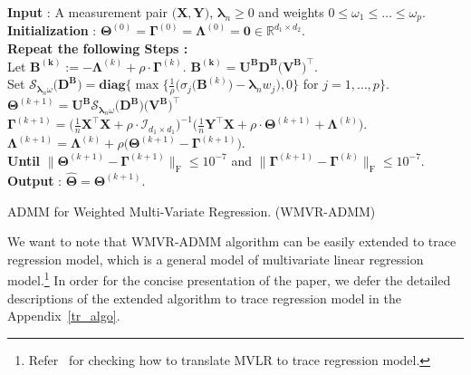 \documentclass[alpha-refs]{wiley-article}
\begin{document}
\begin{algorithm}[t]
    \textbf{Input} : A measurement pair $\big( \boldsymbol{X}, \boldsymbol{Y} \big)$, $\boldsymbol{\lambda}_{n} \geq 0$ and weights $0\leq \omega_{1} \leq \dots \leq \omega_{p}$. \\
    \textbf{Initialization} : $\boldsymbol{\Theta}^{(0)}=\boldsymbol{\Gamma}^{(0)}=\boldsymbol{\Lambda}^{(0)}=\boldsymbol{0} \in\mathbb{R}^{d_{1}\times d_{2}}$. \\
    {\bf Repeat the following Steps :} \\
     Let $\boldsymbol{B^{(k)}}:=-\boldsymbol{\Lambda}^{(k)}+\rho \cdot \boldsymbol{\Gamma}^{(k)}$.
    \quad $\boldsymbol{B^{(k)}}=\boldsymbol{U}^{\textbf{B}}\boldsymbol{D}^{\textbf{B}}\big(\boldsymbol{V}^{\textbf{B}}\big)^{\top}$. \\
    \qquad \qquad \qquad Set $\mathcal{S}_{\boldsymbol{\lambda}_{n}\omega}\big(\boldsymbol{D}^{\textbf{B}}\big)=\textbf{diag}\bigg\{ \max\bigg\{\frac{1}{\rho}\big(\sigma_{j}(\boldsymbol{B}^{(k)}\big)-\boldsymbol{\lambda}_{n} w_{j}\big),0 \bigg\}$ for $j=1,\dots,p \bigg\}$.  \\
    \qquad \qquad \qquad $\boldsymbol{\Theta}^{(k+1)} = \boldsymbol{U}^{\textbf{B}}\mathcal{S}_{\boldsymbol{\lambda}_{n}\omega}\big(\boldsymbol{D}^{\textbf{B}}\big)\big(\boldsymbol{V}^{\textbf{B}}\big)^{\top}$ \\
    $\boldsymbol{\Gamma}^{(k+1)} = \big( \frac{1}{n}\boldsymbol{X}^{\top}\boldsymbol{X}+\rho\cdot\mathcal{I}_{d_{1} \times d_{1}} \big)^{-1}\big( \frac{1}{n}\boldsymbol{Y}^{\top}\boldsymbol{X} + \rho \cdot \boldsymbol{\Theta}^{(k+1)} + \boldsymbol{\Lambda}^{(k)} \big).$\\
     $\boldsymbol{\Lambda}^{(k+1)} = \boldsymbol{\Lambda}^{(k)} + \rho\big( \boldsymbol{\Theta}^{(k+1)}-\boldsymbol{\Gamma}^{(k+1)} \big)$.\\
    {\bf Until} $\| \boldsymbol{\Theta}^{(k+1)}-\boldsymbol{\Gamma}^{(k+1)} \|_{\text{F}}\leq 10^{-7}$ and $\| \boldsymbol{\Gamma}^{(k+1)}-\boldsymbol{\Gamma}^{(k)} \|_{\text{F}}\leq 10^{-7}$. \\
    \textbf{Output} : $\widehat{\boldsymbol{\Theta}}=\boldsymbol{\Theta}^{(k+1)}$.
    \caption{ADMM for Weighted Multi-Variate Regression. (WMVR-ADMM)}
    \label{alg:1}
\end{algorithm}

\begin{remark}
We want to note that WMVR-ADMM algorithm can be easily extended to trace regression model, which is a general model of multivariate linear regression model.\footnote{Refer~\citet{negahban2011estimation} for checking how to translate MVLR to trace regression model.}
In order for the concise presentation of the paper, we defer the detailed descriptions of the extended algorithm to trace regression model in the Appendix~\ref{tr_algo}.
\end{remark}
\end{document}

